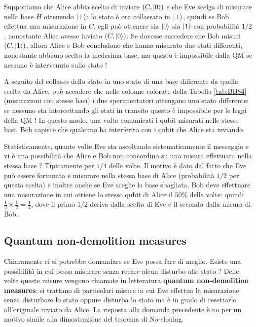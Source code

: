 \begin{esempio}
    Supponiamo che Alice abbia scelto di inviare $(C, \ket{0})$ e che Eve scelga di misurare nella base $H$ ottenendo $\ket{+}$: lo stato è ora collassato in $\ket{+}$, quindi se Bob effettua una misurazione in $C$, egli può ottenere sia $\ket{0}$ sia $\ket{1}$ con probabilità $1/2$, nonostante Alice avesse inviato $(C, \ket{0})$. Se dovesse succedere che Bob misuri $(C,\ket{1})$, allora Alice e Bob concludono che hanno misurato due stati differenti, nonostante abbiano scelto la medesima base, ma questo è impossibile dalla QM se nessuno è intervenuto sullo stato !
\end{esempio}

\noindent A seguito del collasso dello stato in uno stato di una base differente da quella scelta da Alice, può accadere che nelle colonne colorate della Tabella \ref{tab:BB84} (misurazioni con stesse basi) i due sperimentatori ottengano uno stato differente: se nessuno sta intercettando gli stati in transito questo è impossibile per le leggi della QM ! In questo modo, una volta comunicati i qubit misurati nelle stesse basi, Bob capisce che qualcuno ha interferito con i qubit che Alice sta inviando. 

\noindent Statisticamente, quante volte Eve sta ascoltando sistematicamente il messaggio e vi è una possibilità che Alice e Bob non concordino su una misura effettuata nella stessa base ? Tipicamente per $1/4$ delle volte. Il motivo è dato dal fatto che Eve può essere fortunata e misurare nella stessa base di Alice (probabilità $1/2$ per questa scelta) e inoltre anche se Eve sceglie la base sbagliata, Bob deve effettuare una misurazione in cui ottiene lo stesso qubit di Alice il 50\% delle volte: quindi $\frac{1}{2} \times \frac{1}{2} = \frac{1}{4}$, dove il primo $1/2$ deriva dalla scelta di Eve e il secondo dalla misura di Bob.  

\subsection{Quantum non-demolition measures}
Chiaramente ci si potrebbe domandare se Eve possa fare di meglio. Esiste una possibilità in cui possa misurare senza recare alcun disturbo allo stato ? Delle volte queste misure vengono chiamate in letteratura \textbf{quantum non-demolition measures}: si trattano di particolari misure in cui Eve effettua la misurazione senza disturbare lo stato oppure disturba lo stato ma è in grado di resettarlo all'originale inviato da Alice. La risposta alla domanda precedente è no per un motivo simile alla dimostrazione del teorema di No-cloning.

